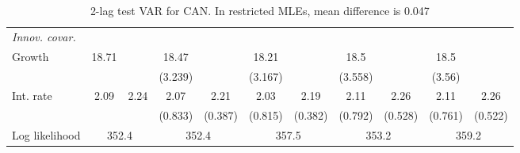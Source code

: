 \begin{table}[htbp]
\begin{tabular}{@{\extracolsep{4pt}}lcccccccccc@{}}
\rule{0pt}{4ex} \emph{Innov. covar.}  	 & 	 & 	 & 	 & 	 & 	 & 	 & 	 & 	 & 	 &\\ 
\quad Growth 	 &18.71 	 &  	 & 18.47 	 &  	 & 18.21 	 &  	 & 18.5 	 &  	 & 18.5 	 & 	 \\ 
 		 &  	 &  	 & (3.239) 	 &  	 & (3.167) 	 &  	 & (3.558) 	 &  	 & (3.56) 	 &  	 \\ 
\quad Int. rate 	 &2.09 	 & 2.24 	 & 2.07 	 & 2.21 	 & 2.03 	 & 2.19 	 & 2.11 	 & 2.26 	 & 2.11 	 & 2.26	 \\ 
 		 &  	 &  	 & (0.833) 	 & (0.387) 	 & (0.815) 	 & (0.382) 	 & (0.792) 	 & (0.528) 	 & (0.761) 	 & (0.522) 	 \\ 
 \hline \rule{0pt}{4ex} 
  Log likelihood 	 &\multicolumn{2}{c}{352.4} 	 & \multicolumn{2}{c}{352.4} 	 & \multicolumn{2}{c}{357.5} 	 & \multicolumn{2}{c}{353.2} 	 & \multicolumn{2}{c}{359.2}\\ 

 \hline 	\end{tabular}		\caption{2-lag test VAR for CAN. In restricted MLEs, mean difference is 0.047}
		\label{tab:CAN2lag}

\end{table}